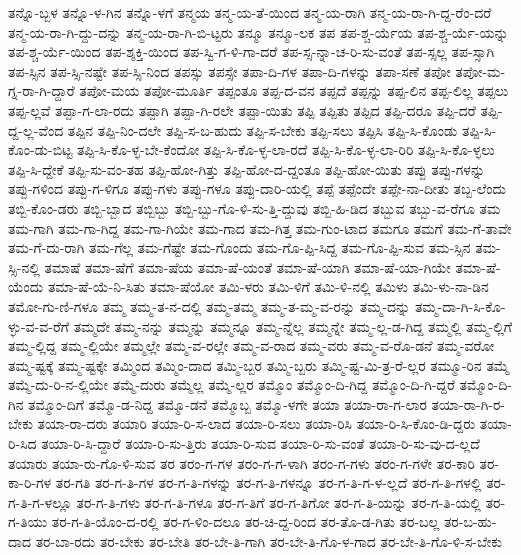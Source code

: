 {ತನ್ನೊ-ಬ್ಬಳ
ತನ್ನೊ-ಳ-ಗಿನ
ತನ್ನೊ-ಳಗೆ
ತನ್ಮಯ
ತನ್ಮ-ಯ-ತೆ-ಯಿಂದ
ತನ್ಮ-ಯ-ರಾಗಿ
ತನ್ಮ-ಯ-ರಾ-ಗಿ-ದ್ದ-ರೆಂ-ದರೆ
ತನ್ಮ-ಯ-ರಾ-ಗಿ-ದ್ದು-ದನ್ನು
ತನ್ಮ-ಯ-ರಾ-ಗಿ-ಬಿ-ಟ್ಟರು
ತನ್ಮೂ
ತನ್ಮೂ-ಲಕ
ತಪ
ತಪ-ಶ್ಚ-ರ್ಯೆಯ
ತಪ-ಶ್ಚ-ರ್ಯೆ-ಯನ್ನು
ತಪ-ಶ್ಚ-ರ್ಯೆ-ಯಿಂದ
ತಪ-ಶ್ಶಕ್ತಿ-ಯಿಂದ
ತಪ-ಸ್ವಿ-ಗ-ಳಿ-ಗಾ-ದರೆ
ತಪ-ಸ್ಸ-ನ್ನಾ-ಚ-ರಿ-ಸು-ವಂತೆ
ತಪ-ಸ್ಸಲ್ಲ
ತಪ-ಸ್ಸಾಗಿ
ತಪ-ಸ್ಸಿನ
ತಪ-ಸ್ಸಿ-ನಷ್ಟೇ
ತಪ-ಸ್ಸಿ-ನಿಂದ
ತಪಸ್ಸು
ತಪಸ್ಸೇ
ತಪಾ-ದಿ-ಗಳ
ತಪಾ-ದಿ-ಗಳನ್ನು
ತಪಾ-ಸಣೆ
ತಪೋ
ತಪೋ-ಮ-ಗ್ನ-ರಾ-ಗಿ-ದ್ದಾರೆ
ತಪೋ-ಮಯ
ತಪೋ-ಮೂರ್ತಿ
ತಪ್ಪಂತೂ
ತಪ್ಪ-ದ-ವನ
ತಪ್ಪದೆ
ತಪ್ಪನ್ನು
ತಪ್ಪ-ಲಿನ
ತಪ್ಪ-ಲಿಲ್ಲ
ತಪ್ಪಲು
ತಪ್ಪ-ಲ್ಲವೆ
ತಪ್ಪಾ-ಗ-ಲಾ-ರದು
ತಪ್ಪಾಗಿ
ತಪ್ಪಾ-ಗಿ-ರಲೇ
ತಪ್ಪಾ-ಯಿತು
ತಪ್ಪಿ
ತಪ್ಪಿತು
ತಪ್ಪಿದ
ತಪ್ಪಿ-ದರೂ
ತಪ್ಪಿ-ದರೆ
ತಪ್ಪಿ-ದ್ದ-ಲ್ಲ-ವೆಂದ
ತಪ್ಪಿನ
ತಪ್ಪಿ-ನಿಂ-ದಲೇ
ತಪ್ಪಿ-ಸ-ಬ-ಹುದು
ತಪ್ಪಿ-ಸ-ಬೇಕು
ತಪ್ಪಿ-ಸಲು
ತಪ್ಪಿಸಿ
ತಪ್ಪಿ-ಸಿ-ಕೊಂಡು
ತಪ್ಪಿ-ಸಿ-ಕೊಂ-ಡು-ಬಿಟ್ಟ
ತಪ್ಪಿ-ಸಿ-ಕೊ-ಳ್ಳ-ಬೇ-ಕೆಂದೋ
ತಪ್ಪಿ-ಸಿ-ಕೊ-ಳ್ಳ-ಲಾ-ರದೆ
ತಪ್ಪಿ-ಸಿ-ಕೊ-ಳ್ಳ-ಲಾ-ರಿರಿ
ತಪ್ಪಿ-ಸಿ-ಕೊ-ಳ್ಳಲು
ತಪ್ಪಿ-ಸಿ-ದ್ದೇಕೆ
ತಪ್ಪಿ-ಸು-ವಂ-ತಹ
ತಪ್ಪಿ-ಹೋ-ಗಿತ್ತು
ತಪ್ಪಿ-ಹೋ-ದ-ದ್ದಂತೂ
ತಪ್ಪಿ-ಹೋ-ಯಿತು
ತಪ್ಪು
ತಪ್ಪು-ಗಳನ್ನು
ತಪ್ಪು-ಗಳಿಂದ
ತಪ್ಪು-ಗ-ಳಿಗೂ
ತಪ್ಪು-ಗಳು
ತಪ್ಪು-ಗಳೂ
ತಪ್ಪು-ದಾರಿ-ಯಲ್ಲಿ
ತಪ್ಪೆ
ತಪ್ಪೆಂದೇ
ತಪ್ಪೇ-ನಾ-ದೀತು
ತಬ್ಬ-ಲೆಂದು
ತಬ್ಬಿ-ಕೊಂ-ಡರು
ತಬ್ಬಿ-ಬ್ಬಾದ
ತಬ್ಬಿಬ್ಬು
ತಬ್ಬಿ-ಬ್ಬು-ಗೊ-ಳಿ-ಸು-ತ್ತಿ-ದ್ದುವು
ತಬ್ಬಿ-ಹಿ-ಡಿದ
ತಬ್ಬುವ
ತಬ್ಬು-ವ-ರೆಗೂ
ತಮ
ತಮ-ಗಾಗಿ
ತಮ-ಗಾ-ಗಿದ್ದ
ತಮ-ಗಾ-ಗಿಯೇ
ತಮ-ಗಾದ
ತಮ-ಗಿತ್ತ
ತಮ-ಗುಂ-ಟಾದ
ತಮಗೂ
ತಮಗೆ
ತಮ-ಗೆ-ತಾವೇ
ತಮ-ಗೆ-ದು-ರಾಗಿ
ತಮ-ಗೆಲ್ಲ
ತಮ-ಗೆಷ್ಟೇ
ತಮ-ಗೊಂದು
ತಮ-ಗೊ-ಪ್ಪಿ-ಸಿದ್ದ
ತಮ-ಗೊ-ಪ್ಪಿ-ಸುವ
ತಮ-ಸ್ಸಿನ
ತಮ-ಸ್ಸಿ-ನಲ್ಲಿ
ತಮಾಷೆ
ತಮಾ-ಷೆಗೆ
ತಮಾ-ಷೆಯ
ತಮಾ-ಷೆ-ಯಂತೆ
ತಮಾ-ಷೆ-ಯಾಗಿ
ತಮಾ-ಷೆ-ಯಾ-ಗಿಯೇ
ತಮಾ-ಷೆ-ಯೆಂದು
ತಮಾ-ಷೆ-ಯೆ-ನಿ-ಸಿತು
ತಮಾ-ಷೆಯೋ
ತಮಿ-ಳರು
ತಮಿ-ಳಿಗೆ
ತಮಿ-ಳಿ-ನಲ್ಲಿ
ತಮಿಳು
ತಮಿ-ಳು-ನಾ-ಡಿನ
ತಮೋ-ಗು-ಣಿ-ಗಳೂ
ತಮ್ಮ
ತಮ್ಮ-ತ-ನ-ದಲ್ಲಿ
ತಮ್ಮ-ತಮ್ಮ
ತಮ್ಮ-ತ-ಮ್ಮ-ವ-ರನ್ನು
ತಮ್ಮ-ದನ್ನು
ತಮ್ಮ-ದಾ-ಗಿ-ಸಿ-ಕೊ-ಳ್ಳು-ವ-ವ-ರೆಗೆ
ತಮ್ಮದೇ
ತಮ್ಮ-ನನ್ನು
ತಮ್ಮನ್ನು
ತಮ್ಮನ್ನೂ
ತಮ್ಮ-ನ್ನೆಲ್ಲ
ತಮ್ಮನ್ನೇ
ತಮ್ಮ-ಲ್ಲ-ಡ-ಗಿದ್ದ
ತಮ್ಮಲ್ಲಿ
ತಮ್ಮ-ಲ್ಲಿಗೆ
ತಮ್ಮ-ಲ್ಲಿದ್ದ
ತಮ್ಮ-ಲ್ಲಿಯೇ
ತಮ್ಮಲ್ಲೇ
ತಮ್ಮ-ವ-ರಲ್ಲೇ
ತಮ್ಮ-ವ-ರಾದ
ತಮ್ಮ-ವರು
ತಮ್ಮ-ವ-ರೊ-ಡನೆ
ತಮ್ಮ-ವರೋ
ತಮ್ಮ-ಷ್ಟಕ್ಕೆ
ತಮ್ಮ-ಷ್ಟಕ್ಕೇ
ತಮ್ಮಿಂದ
ತಮ್ಮಿಂ-ದಾದ
ತಮ್ಮಿ-ಬ್ಬರ
ತಮ್ಮಿ-ಬ್ಬರು
ತಮ್ಮಿ-ಷ್ಟ-ಮಿ-ತ್ರ-ರೆ-ಲ್ಲರ
ತಮ್ಮೂ-ರಿನ
ತಮ್ಮೆ
ತಮ್ಮೆ-ದು-ರಿ-ನ-ಲ್ಲಿಯೇ
ತಮ್ಮೆ-ದುರು
ತಮ್ಮೆಲ್ಲ
ತಮ್ಮೆ-ಲ್ಲರ
ತಮ್ಮೊಂ
ತಮ್ಮೊಂ-ದಿ-ಗಿದ್ದ
ತಮ್ಮೊಂ-ದಿ-ಗಿ-ದ್ದರೆ
ತಮ್ಮೊಂ-ದಿ-ಗಿನ
ತಮ್ಮೊಂ-ದಿಗೆ
ತಮ್ಮೊ-ಡ-ನಿದ್ದ
ತಮ್ಮೊ-ಡನೆ
ತಮ್ಮೊಬ್ಬ
ತಮ್ಮೊ-ಳಗೇ
ತಯಾ
ತಯಾ-ರಾ-ಗ-ಲಾರ
ತಯಾ-ರಾ-ಗಿ-ರ-ಬೇಕು
ತಯಾ-ರಾ-ದರು
ತಯಾರಿ
ತಯಾ-ರಿ-ಸ-ಲಾದ
ತಯಾ-ರಿ-ಸಲು
ತಯಾ-ರಿಸಿ
ತಯಾ-ರಿ-ಸಿ-ಕೊಂ-ಡಿ-ದ್ದರು
ತಯಾ-ರಿ-ಸಿದ
ತಯಾ-ರಿ-ಸಿ-ದ್ದಾರೆ
ತಯಾ-ರಿ-ಸು-ತ್ತಿರು
ತಯಾ-ರಿ-ಸುವ
ತಯಾ-ರಿ-ಸು-ವಂತೆ
ತಯಾ-ರಿ-ಸು-ವು-ದ-ಲ್ಲದೆ
ತಯಾರು
ತಯಾ-ರು-ಗೊ-ಳಿ-ಸುವ
ತರ
ತರಂ-ಗ-ಗಳ
ತರಂ-ಗ-ಗ-ಳಾಗಿ
ತರಂ-ಗ-ಗಳು
ತರಂ-ಗ-ಗಳೇ
ತರ-ಕಾರಿ
ತರ-ಕಾ-ರಿ-ಗಳ
ತರ-ಗತಿ
ತರ-ಗ-ತಿ-ಗಳ
ತರ-ಗ-ತಿ-ಗಳನ್ನು
ತರ-ಗ-ತಿ-ಗಳನ್ನೂ
ತರ-ಗ-ತಿ-ಗ-ಳ-ಲ್ಲದೆ
ತರ-ಗ-ತಿ-ಗಳಲ್ಲಿ
ತರ-ಗ-ತಿ-ಗ-ಳಲ್ಲೂ
ತರ-ಗ-ತಿ-ಗಳು
ತರ-ಗ-ತಿ-ಗಳೂ
ತರ-ಗ-ತಿಗೆ
ತರ-ಗ-ತಿಗೋ
ತರ-ಗ-ತಿ-ಯನ್ನು
ತರ-ಗ-ತಿ-ಯಲ್ಲಿ
ತರ-ಗ-ತಿಯು
ತರ-ಗ-ತಿ-ಯೊಂ-ದ-ರಲ್ಲಿ
ತರ-ಗ-ಳಿಂ-ದಲೂ
ತರ-ಚಿ-ದ್ದ-ರಿಂದ
ತರ-ತೊ-ಡ-ಗಿತು
ತರ-ಬಲ್ಲ
ತರ-ಬ-ಹು-ದಾದ
ತರ-ಬಾ-ರದು
ತರ-ಬೇಕು
ತರ-ಬೇತಿ
ತರ-ಬೇ-ತಿ-ಗಾಗಿ
ತರ-ಬೇ-ತಿ-ಗೊ-ಳ-ಗಾದ
ತರ-ಬೇ-ತಿ-ಗೊ-ಳಿ-ಸ-ಬೇಕು
}
